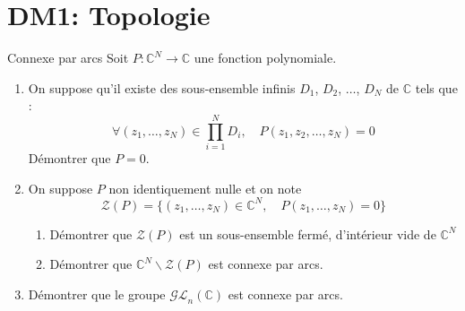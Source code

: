 \chapter{DM1: Topologie} %
\label{chap:DM1: Topologie}

\begin{question}{Connexe par arcs}{}
Soit $P : \mathbb{C} ^{N} \to \mathbb{C}$ une fonction polynomiale.

\begin{enumerate}
  \item On suppose qu'il existe des sous-ensemble infinis $D_1$, $D_2$, $\dots$, $D_N$ de $\mathbb{C}$ tels que :
    \begin{equation}
      \forall (z_1, \dots, z_N) \in \prod_{i=1}^{N} D_i,\quad P(z_1, z_2, \dots, z_N) = 0
    \end{equation}
    Démontrer que $P=0$.

  \item On suppose $P$ non identiquement nulle et on note 
    \begin{equation}
      \mathcal{Z}(P) = \{(z_1, \dots,z_N) \in \mathbb{C}^{N}, \quad P(z_1, \dots, z_N) = 0\}
    \end{equation}

    \begin{enumerate}
      \item Démontrer que $\mathcal{Z}(P)$ est un sous-ensemble fermé, d'intérieur vide de $\mathbb{C}^{N}$
      \item Démontrer que $\mathbb{C} ^{N} \backslash \mathcal{Z}(P)$ est connexe par arcs.
    \end{enumerate}

   \item Démontrer que le groupe $\mathcal{GL}_{n}(\mathbb{C})$ est connexe par arcs.
\end{enumerate}
\end{question}

